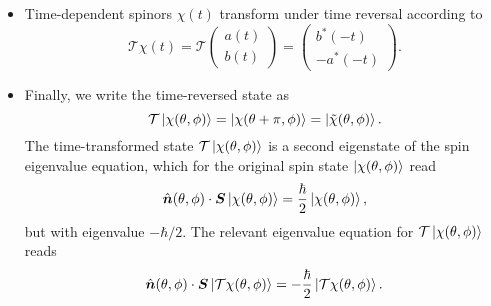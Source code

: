 \documentclass[11pt, a4paper]{article}
\renewcommand{\vec}[1]{\bm{#1}}  %
\newcommand{\uvec}[1]{\hat{\vec{#1}}}  %
\renewcommand{\t}[1]{\tilde{#1}}
\renewcommand{\S}{\vec{S}}  %
\newcommand{\T}{\mathcal{T}}  %
\begin{document}
\begin{itemize}
	\item Time-dependent spinors $ \chi(t) $ transform under time reversal according to
	\begin{equation*}
		\T\chi(t) = \T
		\begin{pmatrix}
		a(t)\\
		b (t)
		\end{pmatrix}
		=
		\begin{pmatrix}
		b^{*}(-t) \\
		-a^{*}(-t)
		\end{pmatrix}.
	\end{equation*}
	
	\item Finally, we write the time-reversed state as
	\begin{equation*}
		\T \ket{\chi(\theta, \phi)} = \ket{\chi(\theta + \pi, \phi)} = \ket{\t{\chi}(\theta, \phi)}.
	\end{equation*}
    The time-transformed state $ \T \ket{\chi(\theta, \phi)} $ is a second eigenstate of the spin eigenvalue equation, which for the original spin state $ \ket{\chi(\theta, \phi)} $ read
    \begin{equation*}
        \uvec{n}(\theta, \phi) \cdot \S \ket{\chi(\theta, \phi)} = \frac{\hbar}{2} \ket{\chi(\theta, \phi)},
    \end{equation*}
     but with eigenvalue $ - \hbar/2 $. The relevant eigenvalue equation for $ \T \ket{\chi(\theta, \phi)} $ reads
	\begin{equation*}
		\uvec{n}(\theta, \phi) \cdot \S \ket{\T\chi(\theta, \phi)} = -\frac{\hbar}{2} \ket{\T \chi(\theta, \phi)}.
	\end{equation*}
	
\end{itemize}
\end{document}
